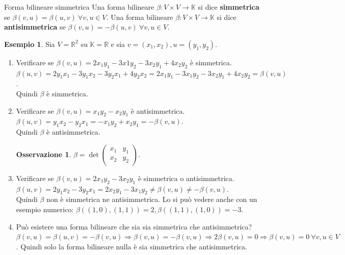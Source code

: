 \documentclass[a4paper]{article}
\theoremstyle{definition}
\newtheorem*{oss}{Osservazione}
\newtheorem*{es}{Esempio}
\begin{document}
	\begin{deff}{Forma bilineare simmetrica}{}
		Una forma bilineare $\beta: V \times V \to \mathbb{K}$ si dice \textbf{simmetrica} se $\beta(v, u) = \beta(u, v) \ \forall v, u \in V$.
		Una forma bilineare $\beta: V \times V \to \mathbb{K}$ si dice \textbf{antisimmetrica} se $\beta(v, u) = -\beta(u, v) \ \forall v, u \in V$.
	\end{deff}

	\begin{es}
		Sia $V = \mathbb{R}^2$ su $\mathbb{K} = \mathbb{R}$ e sia $v = (x_1, x_2), u = (y_1, y_2)$. \\
		\begin{enumerate}
			\item Verificare se $\beta(v, u) = 2x_1y_1 - 3x1y_2 - 3x_2y_1 + 4x_2y_2$ è simmetrica. \\
			$\beta(u, v) = 2y_1x_1 - 3y_1x_2 - 3y_2x_1 + 4y_2x_2 = 2x_1y_1 - 3x_1y_2 - 3x_2y_1 + 4x_2y_2 = \beta(v, u)$. \\
			Quindi $\beta$ è simmetrica.
			\item Verificare se $\beta(v, u) =x_1y_2 - x_2y_1$ è antisimmetrica. \\
			$\beta(u, v) = y_1x_2 - y_2x_1 = -x_1y_2 + x_2y_1 = -\beta(v, u)$. \\
			Quindi $\beta$ è antisimmetrica.
			\begin{oss}
				$\beta = \det \begin{pmatrix}
					x_1 & y_1 \\
					x_2 & y_2
				\end{pmatrix}$.
			\end{oss}
			\item Verificare se $\beta(v, u) = 2x_1y_2 - 3x_2y_1$ è simmetrica o antisimmetrica. \\
			$\beta(u, v) = 2y_1x_2 - 3y_2x_1 = 2x_2y_1 - 3x_1y_2 \ne \beta(v, u) \ne -\beta(v, u)$. \\
			Quindi $\beta$ non è simmetrica ne antisimmetrica.
			Lo si può vedere anche con un esempio numerico: $\beta((1, 0), (1, 1)) = 2, \beta((1, 1), (1, 0)) = -3$.
			\item Può esistere una forma bilineare che sia sia simmetrica che antisimmetrica? \\
			$\beta(v, u) = \beta(u, v) = -\beta(v, u) \Rightarrow \beta(v, u) = -\beta(v, u) \Rightarrow 2\beta(v, u) = 0 \Rightarrow \beta(v, u) = 0 \ \forall v, u \in V$.
			Quindi solo la forma bilineare nulla è sia simmetrica che antisimmetrica.
		\end{enumerate}
	\end{es}
\end{document}

